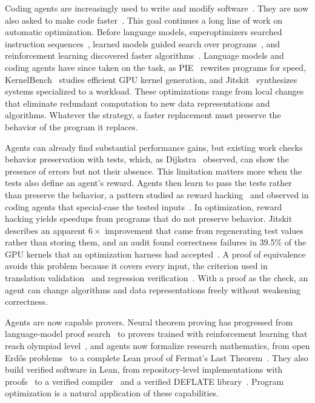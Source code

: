 \documentclass{article}
\begin{document}
Coding agents are increasingly used to write and modify software~\citep{chen2021evaluating,jimenez2024swe,yang2024sweagent}.
They are now also asked to make code faster~\citep{huang2024effibench,du2024mercury,waghjale2024ecco}.
This goal continues a long line of work on automatic optimization.
Before language models, superoptimizers searched instruction sequences~\citep{massalin1987superoptimizer,schkufza2013stochastic}, learned models guided search over programs~\citep{bunel2017learning}, and reinforcement learning discovered faster algorithms~\citep{mankowitz2023faster}.
Language models and coding agents have since taken on the task, as PIE~\citep{shypula2024learning} rewrites programs for speed, KernelBench~\citep{ouyang2025kernelbench} studies efficient GPU kernel generation, and Jitskit~\citep{liu2026time} synthesizes systems specialized to a workload.
These optimizations range from local changes that eliminate redundant computation to new data representations and algorithms.
Whatever the strategy, a faster replacement must preserve the behavior of the program it replaces.

Agents can already find substantial performance gains, but existing work checks behavior preservation with tests, which, as Dijkstra~\citep{dijkstra1972humble} observed, can show the presence of errors but not their absence.
This limitation matters more when the tests also define an agent's reward.
Agents then learn to pass the tests rather than preserve the behavior, a pattern studied as reward hacking~\citep{skalse2022defining} and observed in coding agents that special-case the tested inputs~\citep{zhong2026impossiblebench}.
In optimization, reward hacking yields speedups from programs that do not preserve behavior.
Jitskit~\citep{liu2026time} describes an apparent $6\times$ improvement that came from regenerating test values rather than storing them, and an audit found correctness failures in 39.5\% of the GPU kernels that an optimization harness had accepted~\citep{shah2026contract}.
A proof of equivalence avoids this problem because it covers every input, the criterion used in translation validation~\citep{pnueli1998translation,necula2000translation} and regression verification~\citep{godlin2013regression,churchill2019semantic}.
With a proof as the check, an agent can change algorithms and data representations freely without weakening correctness.

Agents are now capable provers.
Neural theorem proving has progressed from language-model proof search~\citep{polu2020generative,lample2022hypertree} to provers trained with reinforcement learning that reach olympiad level~\citep{hubert2026olympiad,ren2025deepseek,lin2026goedel}, and agents now formalize research mathematics, from open Erd\H{o}s problems~\citep{sothanaphan2026resolution,tsoukalas2026advancing} to a complete Lean proof of Fermat's Last Theorem~\citep{chen2026prove2me,anthropic2026formalizing}.
They also build verified software in Lean, from repository-level implementations with proofs~\citep{ye2026vero} to a verified compiler~\citep{rinard2026testing} and a verified DEFLATE library~\citep{morrison2026leanzip}.
Program optimization is a natural application of these capabilities.
\end{document}

